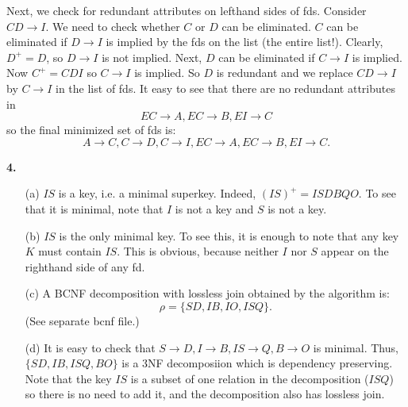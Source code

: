 Next, we check for redundant attributes on lefthand sides of fds.
Consider $CD \rightarrow I$. We need to check whether $C$ or $D$ can be eliminated.
$C$ can be eliminated if $D \rightarrow I$ is implied by the fds on the list
(the entire list!). Clearly, $D^+ = D$, so $D \rightarrow I$ is not implied.
Next, $D$ can be eliminated if $C \rightarrow I$ is implied. Now $C^+ = CDI$ so
$C \rightarrow I$ is implied. So $D$ is redundant and
we replace $CD \rightarrow I$ by $C \rightarrow I$ in the list of fds.
It easy to see that there are no redundant attributes in
$$EC \rightarrow A, EC \rightarrow B, EI \rightarrow C$$
so the final minimized set of fds is:
$$A \rightarrow C, C \rightarrow D, 
C \rightarrow I, EC \rightarrow A, EC \rightarrow B, EI \rightarrow C.$$


\vspace{4mm}
\noindent
{\bf 4.}
\begin{itemize}
\item [(a)] $IS$ is a key, i.e. a minimal superkey. Indeed,
$(IS)^+ = ISDBQO$. To see that it is minimal, note that $I$ is not a key
and $S$ is not a key. \\
\item [(b)] $IS$ is the only minimal key. To see this, 
it is enough
to note that any key $K$ must contain $IS$. This is obvious, because
neither $I$ nor $S$ appear on the righthand side of any fd.  \\
\item [(c)] A BCNF decomposition with lossless join obtained 
by the algorithm is:
$$\rho = \{SD,IB,IO,ISQ\}.$$
(See separate bcnf file.)


\item [(d)] It is easy to check that 
$S \rightarrow D, I \rightarrow B, IS \rightarrow Q, B \rightarrow O$ is minimal. Thus,
$\{SD,IB,ISQ,BO\}$ is a 3NF decomposiion which is dependency preserving.
Note that the key $IS$ is a subset of one relation in the decomposition
($ISQ$) so there is no need to add it, and the decomposition also has lossless
join.  
\end{itemize}



